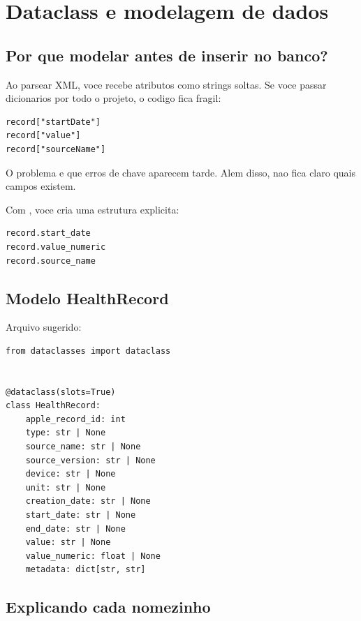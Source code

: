\chapter{Dataclass e modelagem de dados}

\section{Por que modelar antes de inserir no banco?}

Ao parsear XML, voce recebe atributos como strings soltas. Se voce passar dicionarios por todo o projeto, o codigo fica fragil:

\begin{lstlisting}[style=devbutterpython]
record["startDate"]
record["value"]
record["sourceName"]
\end{lstlisting}

O problema e que erros de chave aparecem tarde. Alem disso, nao fica claro quais campos existem.

Com , voce cria uma estrutura explicita:

\begin{lstlisting}[style=devbutterpython]
record.start_date
record.value_numeric
record.source_name
\end{lstlisting}

\section{Modelo HealthRecord}

Arquivo sugerido: 

\begin{lstlisting}[style=devbutterpython]
from dataclasses import dataclass


@dataclass(slots=True)
class HealthRecord:
    apple_record_id: int
    type: str | None
    source_name: str | None
    source_version: str | None
    device: str | None
    unit: str | None
    creation_date: str | None
    start_date: str | None
    end_date: str | None
    value: str | None
    value_numeric: float | None
    metadata: dict[str, str]
\end{lstlisting}

\section{Explicando cada nomezinho}

